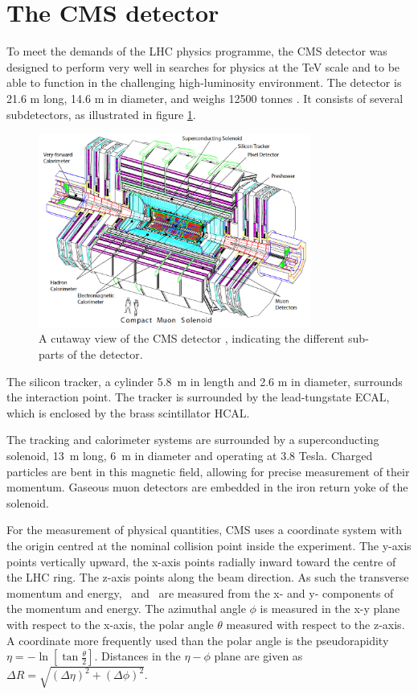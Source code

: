 \section{The \acs{CMS} detector}
\label{sec:CMSLHC_CMS}
To meet the demands of the \ac{LHC} physics programme, the
 \ac{CMS} detector was designed to perform very well in searches
for physics at the TeV scale and to be able to 
function in the challenging high-luminosity environment.
The detector is 21.6 m long, 14.6 m in diameter, and weighs
12500 tonnes \cite{cms-jinst}. It consists of several subdetectors, as illustrated
in figure \ref{fig:cms_detector}.
\begin{figure}[h!]
\includegraphics[width=0.8\textwidth]{./Detector/Plots/cms.png}
\caption[A cutaway view of the CMS detector, indicating the different sub-parts of the detector.]{A cutaway view of the \ac{CMS} detector \cite{cms-jinst}, indicating the
different sub-parts of the detector.}
\label{fig:cms_detector}
\end{figure}

The silicon tracker, a cylinder \mbox{5.8 m} in length and \mbox{2.6} m in
diameter, surrounds the interaction point. The tracker is 
surrounded by the lead-tungstate \ac{ECAL}, which is enclosed
by the brass scintillator \ac{HCAL}.

The tracking and calorimeter systems are surrounded by a superconducting
solenoid, \mbox{13 m} long, \mbox{6 m} in diameter and operating at 3.8 Tesla.
Charged particles are bent in this magnetic field, allowing for precise 
measurement of their momentum. Gaseous muon detectors are embedded in the 
iron return yoke of the solenoid.

For the measurement of physical quantities, \ac{CMS} uses a coordinate
system with the origin centred at the nominal collision point
inside the experiment. The y-axis points vertically upward, the x-axis
points radially inward toward the centre of the \ac{LHC} ring. The z-axis
points along the beam direction. As such the transverse momentum and energy, 
\pT~and \ET~are measured from the x- and y- components of the momentum and energy.
The azimuthal angle $\phi$ is measured in the x-y plane with respect to the x-axis, 
the polar angle $\theta$ measured with respect to the z-axis. A coordinate
more frequently used than the polar angle is the pseudorapidity $\eta = -\ln{[\tan{\frac{\theta}{2}}]}$.
Distances in the $\eta-\phi$ plane are given as $\Delta R = \sqrt{(\Delta\eta)^2+(\Delta\phi)^2}$. 

